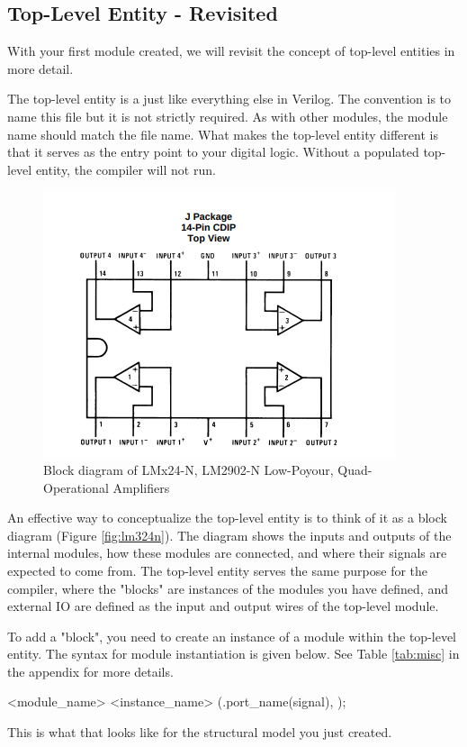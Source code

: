 \documentclass[12pt]{labmanual}
\begin{document}
\subsection{Top-Level Entity - Revisited}
With your first module created, we will revisit the concept of top-level entities in more detail.

The top-level entity is a  just like everything else in Verilog. The convention is to name this file  but it is not strictly required. As with other modules, the module name should match the file name. What makes the top-level entity different is that it serves as the entry point to your digital logic. Without a populated top-level entity, the compiler will not run. 

\begin{figure}
    \centering
    \includegraphics[width=0.5\linewidth]{image_2024-09-26_224700848.png}
    \caption{Block diagram of LMx24-N, LM2902-N Low-Poyour, Quad-Operational Amplifiers} %
    \label{fig:lm324n}
\end{figure}

An effective way to conceptualize the top-level entity is to think of it as a block diagram (Figure \vref{fig:lm324n}). The diagram shows the inputs and outputs of the internal modules, how these modules are connected, and where their signals are expected to come from. The top-level entity serves the same purpose for the compiler, where the "blocks" are instances of the modules you have defined, and external IO are defined as the input and output wires of the top-level module.

To add a "block", you need to create an instance of a module within the top-level entity. The syntax for module instantiation is given below. See Table \vref{tab:misc} in the appendix for more details.
\begin{codeblock}
    <module_name> <instance_name> (.port_name(signal), \cdots);
\end{codeblock}
This is what that looks like for the structural model you just created.
\end{document}

